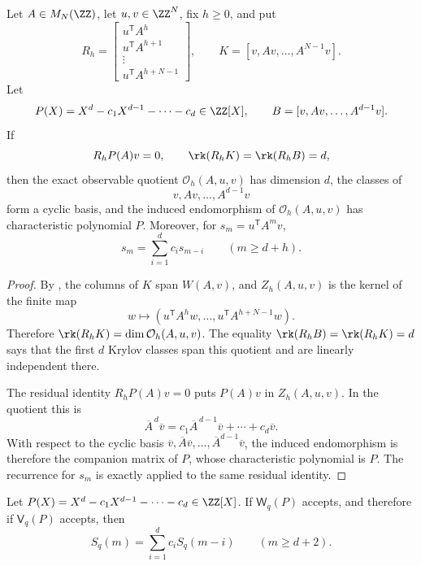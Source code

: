 \begin{lemma}
\label{lem:cyclic-observable-quotient-certificate}
Let \(A\in M_N(\ZZ)\), let \(u,v\in\ZZ^N\), fix \(h\ge0\), and put
\[
  R_h=
  \begin{bmatrix}
  u^{\mathsf T}A^h\\
  u^{\mathsf T}A^{h+1}\\
  \vdots\\
  u^{\mathsf T}A^{h+N-1}
  \end{bmatrix},
  \qquad
  K=[v,Av,\dots,A^{N-1}v].
\]
Let
\[
  P(X)=X^d-c_1X^{d-1}-\cdots-c_d\in\ZZ[X],
  \qquad
  B=[v,Av,\dots,A^{d-1}v].
\]
If
\[
  R_hP(A)v=0,\qquad \rk(R_hK)=\rk(R_hB)=d,
\]
then the exact observable quotient
\(\mathcal O_h(A,u,v)\) has dimension \(d\), the classes of
\[
  v,Av,\dots,A^{d-1}v
\]
form a cyclic basis, and the induced endomorphism of
\(\mathcal O_h(A,u,v)\) has characteristic polynomial \(P\).  Moreover, for
\(s_m=u^{\mathsf T}A^m v\),
\[
  s_m=\sum_{i=1}^d c_i s_{m-i}
  \qquad(m\ge d+h).
\]
\end{lemma}

\begin{proof}
By , the columns of \(K\)
span \(W(A,v)\), and \(Z_h(A,u,v)\) is the kernel of the finite map
\[
  w\longmapsto
  (u^{\mathsf T}A^h w,\dots,u^{\mathsf T}A^{h+N-1}w).
\]
Therefore \(\rk(R_hK)=\dim\mathcal O_h(A,u,v)\).  The equality
\(\rk(R_hB)=\rk(R_hK)=d\) says that the first \(d\) Krylov classes span this
quotient and are linearly independent there.

The residual identity \(R_hP(A)v=0\) puts \(P(A)v\) in \(Z_h(A,u,v)\).  In the
quotient this is
\[
  \overline A^{\,d}\overline v
  =
  c_1\overline A^{\,d-1}\overline v+\cdots+c_d\overline v.
\]
With respect to the cyclic basis
\(\overline v,\overline A\overline v,\dots,\overline A^{d-1}\overline v\),
the induced endomorphism is therefore the companion matrix of \(P\), whose
characteristic polynomial is \(P\).  The recurrence for \(s_m\) is exactly
 applied to the same residual identity.
\end{proof}

\begin{lemma}
\label{lem:exact-kernel-verifier-soundness}
Let \(P(X)=X^d-c_1X^{d-1}-\cdots-c_d\in\ZZ[X]\).  If
\(\mathsf W_q(P)\) accepts, and therefore if \(\mathsf V_q(P)\) accepts, then
\[
  S_q(m)=\sum_{i=1}^d c_iS_q(m-i)
  \qquad(m\ge d+2).
\]
\end{lemma}


